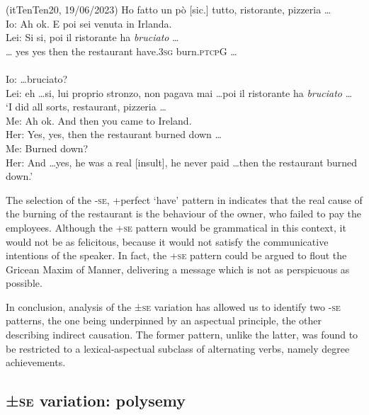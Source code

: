\documentclass[output=paper,colorlinks,citecolor=brown
]{langscibook}
\begin{document}
\hspace*{\fill}(itTenTen20, 19/06/2023)\quad
\ea \label{bentley_example_34}
    Ho fatto un pò [sic.] tutto, ristorante, pizzeria \ldots  \\
    Io: Ah ok. E poi sei venuta in Irlanda. \\
    \gll Lei: Si			si,			poi			il		ristorante	ha						\textit{bruciato}  \ldots    \\
    {\ldots} yes		yes		then		the	restaurant	have.3\textsc{sg}	burn.\textsc{ptcp}G {\ldots} \\ \\
    {Io:  \ldots bruciato?  }\\
    {Lei: eh \ldots si, lui proprio stronzo, non pagava mai \ldots  poi il ristorante ha \textit{bruciato} \ldots } \\
    \glt 	‘I did all sorts, restaurant, pizzeria \ldots  \\
            Me:	Ah ok. And then you came to Ireland. \\
            Her:	Yes, yes, then the restaurant burned down \ldots  \\
            Me:	Burned down? \\
            		Her:	And \ldots  yes, he was a real [insult], he never paid \ldots  then the restaurant burned down.’
\z
   

The selection of the {-\textsc{se}, +perfect ‘have’} pattern in  indicates that the real cause of the burning of the restaurant is the behaviour of the owner, who failed to pay the employees. Although the +\textsc{se} pattern would be grammatical in this context, it would not be as felicitous, because it would not satisfy the communicative intentions of the speaker. In fact, the +\textsc{se} pattern could be argued to flout the Gricean Maxim of Manner, delivering a message which is not as perspicuous as possible.

In conclusion, analysis of the ±\textsc{se} variation has allowed us to identify two -\textsc{se} patterns, the one being underpinned by an aspectual principle, the other describing indirect causation. The former pattern, unlike the latter, was found to be restricted to a lexical-aspectual subclass of alternating verbs, namely degree achievements.

\subsection{±\textsc{se} variation: polysemy}
\label{bentley_section_4.3}
\end{document}
